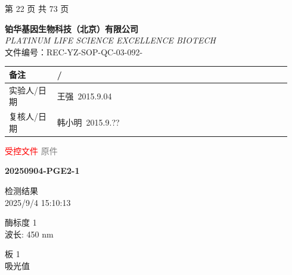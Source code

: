 \documentclass[UTF8,10pt,a4paper,fontset=fandol]{ctexart}
\newcommand{\fieldvalue}[1]{#1}
\newcommand{\handwritten}[1]{#1}
\begin{document}
\begin{center}
第 22 页 共 73 页
\end{center}

\newpage

\noindent
\begin{minipage}{\linewidth}
\small
\textbf{铂华基因生物科技（北京）有限公司}\\
\textit{PLATINUM LIFE SCIENCE EXCELLENCE BIOTECH}\\
\hfill 文件编号：REC-YZ-SOP-QC-03-092-\hspace{1.5cm}
\end{minipage}

\medskip

\noindent
\begin{tabular}{|p{0.16\linewidth}|p{0.78\linewidth}|}
\hline
备注 &
\fieldvalue{\handwritten{/}}
\\
\hline
实验人/日期 &
\fieldvalue{\handwritten{王强\ 2015.9.04}}
\\
\hline
复核人/日期 &
\fieldvalue{\handwritten{韩小明\ 2015.9.??}}
\\
\hline
\end{tabular}

\medskip

\noindent
\textcolor{red}{受控文件}
\hfill
\textcolor{gray}{原件}

\newpage

\noindent\textbf{20250904-PGE2-1}

\medskip
\noindent 检测结果\\
2025/9/4 15:10:13

\medskip
\noindent 酶标度 1\\
波长: 450 nm

\medskip
\noindent 板 1\\
吸光值
\end{document}
